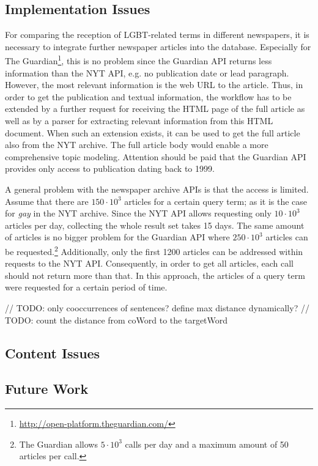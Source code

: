 \documentclass[10pt,a4paper,twocolumn]{scrartcl}
\begin{document}
\subsection{Implementation Issues}
For comparing the reception of LGBT-related terms in different newspapers, it is necessary to integrate further newspaper articles into the database. Especially for The Guardian\footnote{\url{http://open-platform.theguardian.com/}}, this is no problem since the Guardian API returns less information than the NYT API, e.g. no publication date or lead paragraph. However, the most relevant information is the web URL to the article. Thus, in order to get the publication and textual information, the workflow has to be extended by a further request for receiving the HTML page of the full article as well as by a parser for extracting relevant information from this HTML document. When such an extension exists, it can be used to get the full article also from the NYT archive. The full article body would enable a more comprehensive topic modeling. Attention should be paid that the Guardian API provides only access to publication dating back to 1999.

A general problem with the newspaper archive APIs is that the access is limited. Assume that there are $150 \cdot 10^3$ articles for a certain query term; as it is the case for \textit{gay} in the NYT archive. Since the NYT API allows requesting only $10\cdot 10^3$ articles per day, collecting the whole result set takes 15 days. The same amount of articles is no bigger problem for the Guardian API where $250\cdot 10^3$ articles can be requested.\footnote{The Guardian allows $5\cdot 10^3$ calls per day and a maximum amount of 50 articles per call.} Additionally, only the first 1200 articles can be addressed within requests to the NYT API. Consequently, in order to get all articles, each call should not return more than that. In this approach, the articles of a query term were requested for a certain period of time.
 
// TODO: only cooccurrences of sentences? define max distance dynamically?
// TODO: count the distance from coWord to the targetWord

\subsection{Content Issues}

\subsection{Future Work}
\end{document}
